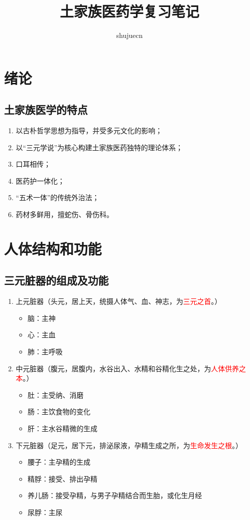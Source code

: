 \documentclass[cn,blue,12pt,normal,founder]{elegantnote}
\title{土家族医药学复习笔记}
\author{shujuecn}
\date{\zhtoday}
\newcommand{\redt}[1]{\textcolor{red}{{}#1}}      %
\begin{document}
\maketitle

\section{绪论}

\subsection{土家族医学的特点}

\begin{enumerate}
  \item 以古朴哲学思想为指导，并受多元文化的影响；
  \item 以“三元学说”为核心构建土家族医药独特的理论体系；
  \item 口耳相传；
  \item 医药护一体化；
  \item “五术一体”的传统外治法；
  \item 药材多鲜用，擅蛇伤、骨伤科。
\end{enumerate}

\section{人体结构和功能}

\subsection{三元脏器的组成及功能}

\begin{enumerate}
  \item 上元脏器（头元，居上天，统摄人体气、血、神志，为\redt{三元之首}。）
  \begin{itemize}
    \item 脑：主神
    \item 心：主血
    \item 肺：主呼吸
  \end{itemize}
  \item 中元脏器（腹元，居腹内，水谷出入、水精和谷精化生之处，为\redt{人体供养之本}。）
  \begin{itemize}
    \item 肚：主受纳、消磨
    \item 肠：主饮食物的变化
    \item 肝：主水谷精微的生成
  \end{itemize}
  \item 下元脏器（足元，居下元，排泌尿液，孕精生成之所，为\redt{生命发生之根}。）
  \begin{itemize}
    \item 腰子：主孕精的生成
    \item 精脬：接受、排出孕精
    \item 养儿肠：接受孕精，与男子孕精结合而生胎，或化生月经
    \item 尿脬：主尿
  \end{itemize}
\end{enumerate}
\end{document}
